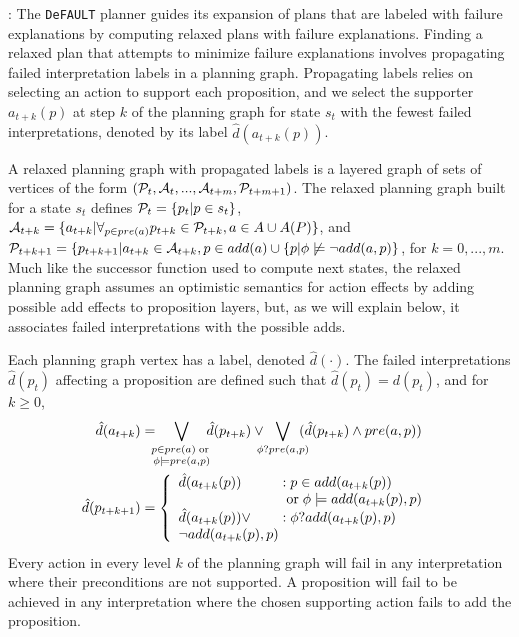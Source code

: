 \documentclass[letterpaper]{article}
\def\und#1{\noindent{\bf #1}:}
\def\citep#1{\cite{#1}}
\def\default{{\tt DeFAULT}}
\begin{document}
\und{Incomplete Domain Relaxed Plans} The \default{} planner
\citep{bryce-icaps11} guides its expansion of plans that are labeled with
failure explanations by computing relaxed plans with failure explanations.   Finding a
relaxed plan that attempts to minimize failure explanations involves propagating
failed interpretation labels in a planning graph.  Propagating labels relies on
selecting an action to support each proposition, and we select the supporter
$a_{t+k}(p)$ at step $k$ of the planning graph for state $s_t$ with the
fewest failed interpretations, denoted by its label $\hat{d}(a_{t+k}(p))$.

A relaxed planning graph with propagated labels is a layered graph of sets of
vertices of the form $({\cal P}_t, {\cal A}_t, ..., {\cal A}_{t+m},
{\cal P}_{t+m+1})$. The relaxed planning graph built for a state
${s}_t$ defines ${\cal P}_t = \{{p}_t | p \in {s}_t\}$,
${\cal A}_{t+k} = \{ {a}_{t+k} | \forall_{p \in {pre}({a})}
{p}_{t+k} \in {\cal P}_{t+k}, {a} \in {A} \cup A(P)\}$, and
${\cal P}_{t+k+1} = \{p_{t+k+1} | {a}_{t+k} \in {\cal A}_{t+k}, p
\in {add}({a}) \cup \{p | \phi\not\models\neg add({a}, p)\}$, for $k
= 0, ..., m$.  Much like the successor function used to compute next states, the
relaxed planning graph assumes an optimistic semantics for action effects by
adding possible add effects to proposition layers, but, as we will explain
below, it associates failed interpretations with the possible adds.

 Each planning graph vertex has a label, denoted $\hat{d}(\cdot)$.  The failed
 interpretations $\hat{d}(p_t) $ affecting a proposition are defined such that
 $\hat{d}(p_t) = d(p_t)$, and for $k \geq 0$,
\begin{align}
\hat{d}({a}_{t+k}) &= \hspace*{-.2cm}
\bigvee\limits_{\substack{p \in pre({a}) \;\text{or}\;\\ \phi\models
pre(a, p) }} \hspace*{-.2cm}
\hat{d}(p_{t+k}) \vee \hspace*{-.25cm} \bigvee\limits_{\phi?pre(a, p)}
\hspace*{-.25cm} (\hat{d}(p_{t+k})  \wedge pre({a}, p) )\notag\\ \notag
\hspace*{-.6cm} \hat{d}(p_{t+k+1}) &= \left\{\begin{array}{l@{\;}l@{\;}r}
\hat{d}({a}_{t+k}(p)) & : p \in add(a_{t+k}(p))\\ & \;\text{or}\; \phi\models
add(a_{t+k}(p), p)\\
\hat{d}(a_{t+k}(p)) \vee& : \phi?add(a_{t+k}(p), p)\\
\neg add(a_{t+k}(p), p)
\end{array}\right. \hspace*{-.1cm}\label{eqn:hprop}
\end{align}
Every action in every level $k$ of the planning graph will fail in any
interpretation where their preconditions are not supported.  A proposition will
fail  to be achieved in any interpretation where the chosen supporting action
fails to add the proposition.
\end{document}
